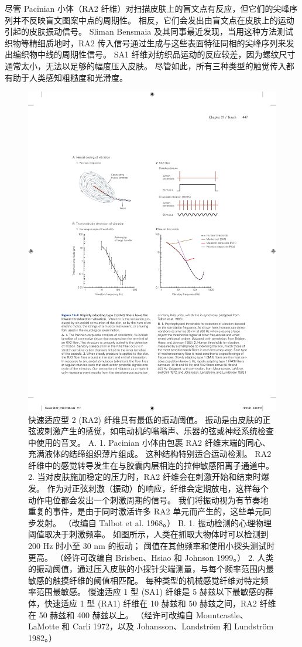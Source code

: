 尽管 Pacinian 小体（RA2 纤维）对扫描皮肤上的盲文点有反应，但它们的尖峰序列并不反映盲文图案中点的周期性。
相反，它们会发出由盲文点在皮肤上的运动引起的皮肤振动信号。
Sliman Bensmaia 及其同事最近发现，当用这种方法测试织物等精细质地时，RA2 传入信号通过生成与这些表面特征同相的尖峰序列来发出编织物中线的周期性信号。
SA1 纤维对纺织品运动的反应较差，因为螺纹尺寸通常太小，无法以足够的幅度压入皮肤。
尽管如此，所有三种类型的触觉传入都有助于人类感知粗糙度和光滑度。


\begin{figure}[htbp]
	\centering
	\includegraphics[width=0.5\linewidth]{chap19/fig_19_8}
	\caption{快速适应型 2 (RA2) 纤维具有最低的振动阈值。
		振动是由皮肤的正弦波刺激产生的感觉，如电动机的嗡嗡声、乐器的弦或神经系统检查中使用的音叉。
		A. 1. Pacinian 小体由包裹 RA2 纤维末端的同心、充满液体的结缔组织薄片组成。 这种结构特别适合运动检测。
		RA2 纤维中的感觉转导发生在与胶囊内层相连的拉伸敏感阳离子通道中。
		2. 当对皮肤施加稳定的压力时，RA2 纤维会在刺激开始和结束时爆发。
		作为对正弦刺激（振动）的响应，纤维会定期放电，这样每个动作电位都会发出一个刺激周期的信号。
		我们将振动视为有节奏地重复的事件，是由于同时激活许多 RA2 单元而产生的，这些单元同步发射。 （改编自 Talbot et al. 1968。）
		B. 1. 振动检测的心理物理阈值取决于刺激频率。
		如图所示，人类在抓取大物体时可以检测到 200 Hz 时小至 30 nm 的振动； 阈值在其他频率和使用小探头测试时更高。 （经许可改编自 Brisben、Hsiao 和 Johnson 1999。）
		2. 人类的振动阈值，通过压入皮肤的小探针尖端测量，与每个频率范围内最敏感的触摸纤维的阈值相匹配。 
		每种类型的机械感觉纤维对特定频率范围最敏感。
		慢速适应 1 型 (SA1) 纤维是 5 赫兹以下最敏感的群体，快速适应 1 型 (RA1) 纤维在 10 赫兹和 50 赫兹之间，RA2 纤维在 50 赫兹和 400 赫兹以上。 （经许可改编自 Mountcastle、LaMotte 和 Carli 1972，以及 Johansson、Landström 和 Lundström 1982。）}
	\label{fig:19_8}
\end{figure}




